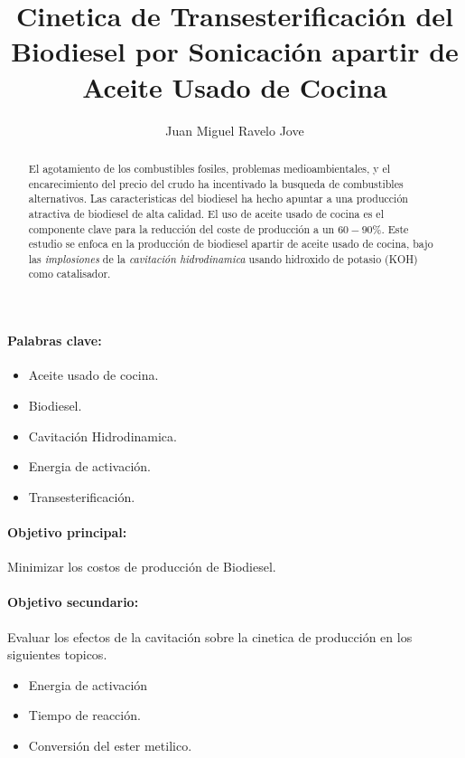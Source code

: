 \documentclass[a4paper,10pt]{article}
\title{Cinetica de Transesterificaci\'on del Biodiesel por Sonicaci\'on apartir de Aceite Usado de Cocina}
\author{Juan Miguel Ravelo Jove}
\begin{document}
\maketitle

\begin{abstract}
El agotamiento de los combustibles fosiles, problemas medioambientales, y el encarecimiento del precio del crudo ha incentivado la busqueda de combustibles alternativos. Las caracteristicas del biodiesel ha hecho apuntar a una producción atractiva de biodiesel de alta calidad. El uso de aceite usado de cocina es el componente clave para la reducción del coste de producción a un $60-90\%$. Este estudio se enfoca en la producción de biodiesel apartir de aceite usado de cocina, bajo las \emph{implosiones} de la \emph{cavitación hidrodinamica} usando hidroxido de potasio (KOH)  como catalisador.
\end{abstract}

\paragraph{Palabras clave:} 
\begin{itemize}
 \item Aceite usado de cocina.
 \item Biodiesel.
 \item Cavitación Hidrodinamica.
 \item Energia de activación.
 \item Transesterificación.
\end{itemize}

\paragraph{Objetivo principal:}
Minimizar los costos de producción de Biodiesel.
\paragraph{Objetivo secundario:}
Evaluar los efectos de la cavitación sobre la cinetica de producción en los siguientes topicos.
\begin{itemize}
 \item Energia de activación
 \item Tiempo de reacción.
 \item Conversión del ester metilico.
\end{itemize}
\end{document}
